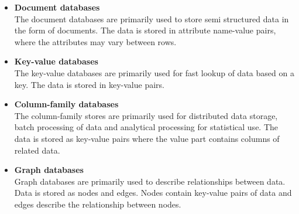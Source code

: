 \begin{itemize}
	\item \textbf{Document databases} \\
	The document databases are primarily used to store semi structured data in the form of documents. The data is stored in attribute name-value pairs, where the attributes may vary between rows.
	
	\item \textbf{Key-value databases} \\
	The key-value databases are primarily used for fast lookup of data based on a key. The data is stored in key-value pairs.
	
	\item \textbf{Column-family databases} \\
	The column-family stores are primarily used for distributed data storage, batch processing of data and analytical processing for statistical use. The data is stored as key-value pairs where the value part contains columns of related data.
	
	\item \textbf{Graph databases} \\
	Graph databases are primarily used to describe relationships between data. Data is stored as nodes and edges. Nodes contain key-value pairs of data and edges describe the relationship between nodes.
\end{itemize}

